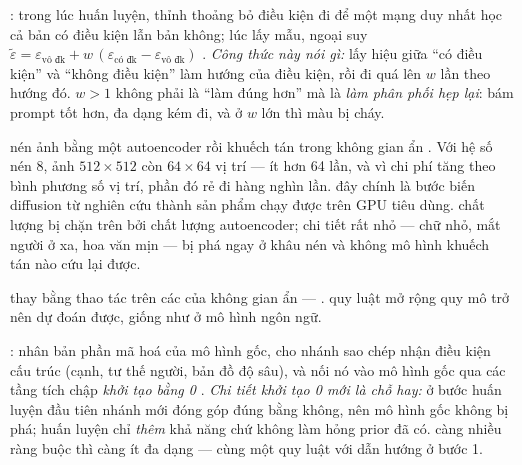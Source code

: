 \documentclass[../../../deep_learning.tex]{subfiles}
\begin{document}
\begin{mach}
\item {} \gp {}: trong lúc huấn luyện, thỉnh thoảng bỏ điều kiện đi để một mạng duy nhất học cả bản có điều kiện lẫn bản không; lúc lấy mẫu, ngoại suy \(\tilde\varepsilon = \varepsilon_{\text{vô đk}} + w\,(\varepsilon_{\text{có đk}}-\varepsilon_{\text{vô đk}})\) \cite{ho2022classifier}. \emph{Công thức này nói gì:} lấy hiệu giữa ``có điều kiện'' và ``không điều kiện'' làm hướng của điều kiện, rồi đi quá lên \(w\) lần theo hướng đó. \gia \(w>1\) không phải là ``làm đúng hơn'' mà là \emph{làm phân phối hẹp lại}: bám prompt tốt hơn, đa dạng kém đi, và ở \(w\) lớn thì màu bị cháy.
\item {} \gp nén ảnh bằng một autoencoder rồi khuếch tán trong không gian ẩn \cite{rombach2022latent}. Với hệ số nén 8, ảnh \(512\times512\) còn \(64\times64\) vị trí --- ít hơn 64 lần, và vì chi phí  tăng theo bình phương số vị trí, phần đó rẻ đi hàng nghìn lần. \hq đây chính là bước biến diffusion từ nghiên cứu thành sản phẩm chạy được trên GPU tiêu dùng.
 \gia chất lượng bị chặn trên bởi chất lượng autoencoder; chi tiết rất nhỏ --- chữ nhỏ, mắt người ở xa, hoa văn mịn --- bị phá ngay ở khâu nén và không mô hình khuếch tán nào cứu lại được.
\item {} \gp thay bằng  thao tác trên các  của không gian ẩn ---  \cite{peebles2023dit}. \hq quy luật mở rộng quy mô trở nên dự đoán được, giống như ở mô hình ngôn ngữ.
\item {} \gp {}: nhân bản phần mã hoá của mô hình gốc, cho nhánh sao chép nhận điều kiện cấu trúc (cạnh, tư thế người, bản đồ độ sâu), và nối nó vào mô hình gốc qua các tầng tích chập \emph{khởi tạo bằng 0} \cite{zhang2023controlnet}. \emph{Chi tiết khởi tạo 0 mới là chỗ hay:} ở bước huấn luyện đầu tiên nhánh mới đóng góp đúng bằng không, nên mô hình gốc không bị phá; huấn luyện chỉ \emph{thêm} khả năng chứ không làm hỏng prior đã có. \gia càng nhiều ràng buộc thì càng ít đa dạng --- cùng một quy luật với dẫn hướng ở bước 1.
\end{mach}
\end{document}
